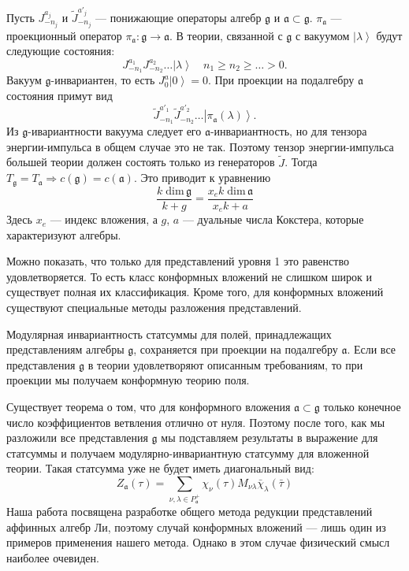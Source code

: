 Пусть $J^{a_j}_{-n_j}$ и $\tilde{J}^{a'_j}_{-n_j}$ --- понижающие операторы алгебр  $\mathfrak{g}$ и
$\mathfrak{a}\subset\mathfrak{g}$.  $\pi_{\mathfrak{a}}$ --- проекционный оператор
$\pi_{\mathfrak{a}}:\mathfrak{g}\longrightarrow \mathfrak{a}$. В теории, связанной с  $\mathfrak{g}$
с вакуумом $\left|\lambda\right>$ будут следующие состояния:
\begin{equation}
  \label{eq:109}
  J^{a_1}_{-n_1}J^{a_2}_{-n_2}\dots\left|\lambda\right>\quad n_1\geq n_2\geq \dots>0.
\end{equation}
Вакуум $\mathfrak{g}$-инвариантен, то есть $J_0^a\left|0\right>=0$. При проекции на подалгебру
$\mathfrak{a}$ состояния примут вид
\begin{equation}
  \label{eq:110}
  \tilde{J}^{a'_1}_{-n_1}\tilde{J}^{a'_2}_{-n_2}\dots\left|\pi_{\mathfrak{a}}(\lambda)\right>.
\end{equation}
Из $\mathfrak{g}$-ивариантности вакуума следует его $\mathfrak{a}$-инвариантность, но для тензора
энергии-импульса в общем случае это не так. Поэтому тензор энергии-импульса большей теории должен
состоять только из генераторов $\tilde{J}$. Тогда $T_{\mathfrak{g}}=T_{\mathfrak{a}}\Rightarrow
c(\mathfrak{g})=c(\mathfrak{a})$. Это приводит к уравнению
\begin{equation}
  \label{eq:111}
  \frac{k\;\mathrm{dim}\,\mathfrak{g}}{k+g}=\frac{x_e k\; \mathrm{dim}\,\mathfrak{a}}{x_ek+a}
\end{equation}
Здесь $x_e$ --- индекс вложения, а  $g$, $a$ --- дуальные числа Кокстера, которые характеризуют алгебры.

Можно показать, что только для представлений уровня 1 это равенство удовлетворяется. То есть класс
конформных вложений не слишком широк и существует полная их классификация. Кроме того, для
конформных вложений существуют специальные методы разложения представлений.

Модулярная инвариантность статсуммы для полей, принадлежащих представлениям алгебры  $\mathfrak{g}$,
сохраняется при проекции на подалгебру $\mathfrak{a}$. Если все представления $\mathfrak{g}$ в теории
удовлетворяют описанным требованиям, то при проекции мы получаем конформную теорию поля.

Существует теорема о том, что для конформного вложения  $\mathfrak{a}\subset\mathfrak{g}$ только
конечное число коэффициентов ветвления отлично от нуля. Поэтому после того, как мы разложили все
представления $\mathfrak{g}$ мы подставляем результаты в выражение для статсуммы и получаем
модулярно-инвариантную статсумму для вложенной теории. Такая статсумма уже не будет иметь
диагональный вид:
\begin{equation}
  \label{eq:36}
   Z_{\mathfrak{a}}(\tau)=\sum_{ \nu,\lambda\in P^{+}_{\mathfrak{a}}} \chi_{\nu}(\tau)M_{\nu\lambda}\bar \chi_{\lambda}(\bar \tau)
\end{equation}
Наша работа посвящена разработке общего метода редукции представлений аффинных алгебр Ли, поэтому
случай конформных вложений --- лишь один из примеров применения нашего метода. Однако в этом случае
физический смысл наиболее очевиден. 





